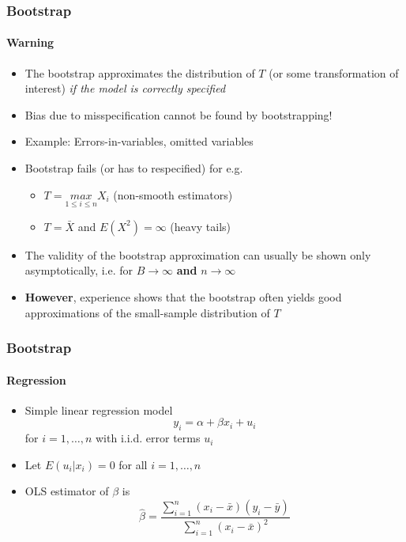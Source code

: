 \documentclass[smaller,compress]{beamer}
\begin{document}
\begin{frame}\frametitle{Bootstrap}\framesubtitle{Warning}
\begin{itemize}
    \item The bootstrap approximates the distribution of $T$ (or some transformation of interest) \emph{if the model is correctly specified}
    \item Bias due to misspecification cannot be found by bootstrapping!
    \item Example: Errors-in-variables, omitted variables
    \item Bootstrap fails (or has to respecified) for e.g.
    \begin{itemize}
      \item $T=\underset{1\leq i \leq n}{max} X_i$ (non-smooth estimators)
      \item $T=\bar{X}$ and $E(X^2)=\infty$ (heavy tails)
    \end{itemize}
    \item The validity of the bootstrap approximation can usually be shown only asymptotically, i.e. for $B\rightarrow \infty $ \textbf{and} $n\rightarrow\infty $
    \item \textbf{However}, experience shows that the bootstrap often yields good approximations of the small-sample distribution of $T$
\end{itemize}
\end{frame}


\begin{frame}\frametitle{Bootstrap}\framesubtitle{Regression}
\begin{itemize}
    \item Simple linear regression model
    \begin{equation*}
    y_{i}=\alpha +\beta x_{i}+u_{i}
    \end{equation*}
    for $i=1,\ldots ,n$ with i.i.d. error terms $u_{i}$
    \item Let $E(u_{i}|x_{i})=0$ for all $i=1,\ldots ,n$
    \item OLS estimator of $\beta $ is
    \begin{equation*}
    \hat{\beta}=\frac{\sum_{i=1}^{n}\left( x_{i}-\bar{x}\right) \left( y_{i}-\bar{y}\right) }{\sum_{i=1}^{n}\left( x_{i}-\bar{x}\right) ^{2}}
    \end{equation*}
\end{itemize}
\end{frame}
\end{document}
